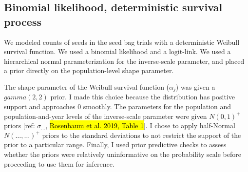 \documentclass[12pt, oneside, titlepage]{article}   	%
\begin{document}


\subsection*{Binomial likelihood, deterministic survival process}

We modeled counts of seeds in the seed bag trials with a deterministic Weibull survival function. We used a binomial likelihood and a logit-link. We used a hierarchical normal parameterization for the inverse-scale parameter, and placed a prior directly on the population-level shape parameter. 

The shape parameter of the Weibull survival function ($\alpha_j$) was given a $gamma(2,2)$ prior. I made this choice because the distribution has positive support and approaches 0 smoothly. The parameters for the population and population-and-year levels of the inverse-scale parameter were given $N(0,1)^+$ priors [ref: $\sigma_{\dots}$, \hl{Rosenbaum et al. 2019, Table 1}]. I chose to apply half-Normal $N(\dots,\dots)^+$ priors to the standard deviations to not restrict the support of the prior to a particular range. Finally, I used prior predictive checks to assess whether the priors were relatively uninformative on the probability scale before proceeding to use them for inference.

\end{document}

